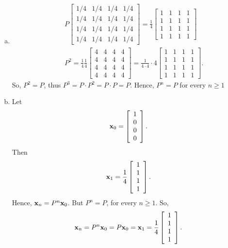 \vspace{2mm}
\begin{enumerate}[a)]
  \item
\begin{eqnarray}
  &&P\left[\begin{array}{cccc}1/4&1/4&1/4&1/4\\1/4&1/4&1/4&1/4\\1/4&1/4&1/4&1/4\\1/4&1/4&1/4&1/4\end{array}\right] =
	\frac{1}{4}\left[\begin{array}{cccc}1&1&1&1\\1&1&1&1\\1&1&1&1\\1&1&1&1\end{array}\right]\\
	&&P^2=\frac{1}{4}\frac{1}{4}\left[\begin{array}{cccc}4&4&4&4\\4&4&4&4\\4&4&4&4\\4&4&4&4\end{array}\right]=
	\frac{1}{4\cdot4}\cdot4\left[\begin{array}{cccc}1&1&1&1\\1&1&1&1\\1&1&1&1\\1&1&1&1\end{array}\right].
\end{eqnarray}
So, $P^2=P$, thus $P^3=P\cdot P^2=P\cdot P=P$. Hence, $P^n=P$ for every $n\ge1$
\item
Let
$$
{\bf x}_0=\left[\begin{array}{c}1\\0\\0\\0\end{array}\right].
$$
Then 
$$
{\bf x}_1=\frac{1}{4}\left[\begin{array}{c}1\\1\\1\\1\end{array}\right].
$$
Hence, ${\bf x}_n=P^n{\bf x}_0$. But $P^n=P$, for every $n\ge1$. So,
$$
{\bf x}_n = P^n{\bf x}_0=P{\bf x}_0={\bf x}_1=
\frac{1}{4}\left[\begin{array}{c}1\\1\\1\\1\end{array}\right].
$$
\end{enumerate}
